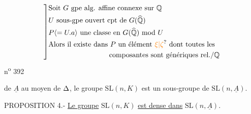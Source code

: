 \[
\left]\begin{aligned}
&\text{Soit }G\ \text{gpe alg. affine connexe sur }\mathbb Q\\
&U\ \text{sous-gpe ouvert cpt de }G(\widehat{\mathbb Q})\\
&P\inserted{=U.a}\ \text{une classe en }G(\widehat{\mathbb Q})\ \text{mod }U\\
&\text{Alors il existe dans }P\ \text{un élément }\unsure{\xi|\zeta}\ \text{dont toutes les}\\
&\hspace{3cm}\text{composantes sont génériques rel./}\mathbb Q
\end{aligned}\right.
\]
\hfill n\textsuperscript{o} 392

de $\underline{A}$ au moyen de $\Delta$, le groupe $\mathrm{SL}(n,K)$ est un sous-groupe de $\mathrm{SL}(n,\underline{A})$.

PROPOSITION 4.- \uline{Le groupe} $\mathrm{SL}(n,K)$ \uline{est dense dans} $\mathrm{SL}(n,\underline{A})$.

